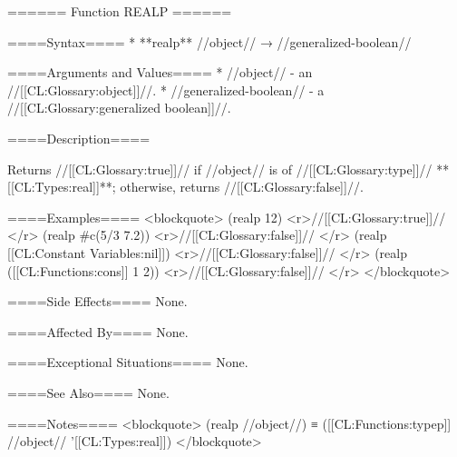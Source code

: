 ====== Function REALP ======

====Syntax====
  * **realp** //object// → //generalized-boolean//

====Arguments and Values====
  * //object// - an //[[CL:Glossary:object]]//.
  * //generalized-boolean// - a //[[CL:Glossary:generalized boolean]]//.

====Description====

Returns //[[CL:Glossary:true]]// if //object// is of //[[CL:Glossary:type]]// **[[CL:Types:real]]**; otherwise, returns //[[CL:Glossary:false]]//.

====Examples==== 
<blockquote> 
(realp 12) <r>//[[CL:Glossary:true]]// </r>
(realp #c(5/3 7.2)) <r>//[[CL:Glossary:false]]// </r>
(realp [[CL:Constant Variables:nil]]) <r>//[[CL:Glossary:false]]// </r>
(realp ([[CL:Functions:cons]] 1 2)) <r>//[[CL:Glossary:false]]// </r>
</blockquote>

====Side Effects====
None.

====Affected By====
None.

====Exceptional Situations====
None.

====See Also====
None.

====Notes====
<blockquote> 
(realp //object//) ≡ ([[CL:Functions:typep]] //object// '[[CL:Types:real]]) 
</blockquote>

